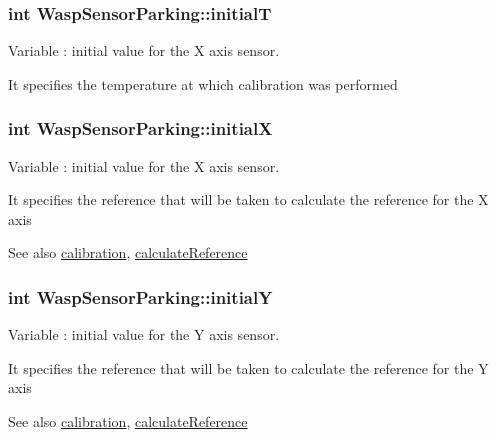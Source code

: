 \subsubsection[{\texorpdfstring{initialT}{initialT}}]{\setlength{\rightskip}{0pt plus 5cm}int Wasp\+Sensor\+Parking\+::initialT}\hypertarget{class_wasp_sensor_parking_adb9a140ea401fbd67abc125f9e1d876f}{}\label{class_wasp_sensor_parking_adb9a140ea401fbd67abc125f9e1d876f}


Variable \+: initial value for the X axis sensor. 

It specifies the temperature at which calibration was performed 
\subsubsection[{\texorpdfstring{initialX}{initialX}}]{\setlength{\rightskip}{0pt plus 5cm}int Wasp\+Sensor\+Parking\+::initialX}\hypertarget{class_wasp_sensor_parking_a0010d75cfb492aef0794721fa9b762ef}{}\label{class_wasp_sensor_parking_a0010d75cfb492aef0794721fa9b762ef}


Variable \+: initial value for the X axis sensor. 

It specifies the reference that will be taken to calculate the reference for the X axis \begin{DoxySeeAlso}{See also}
\hyperlink{class_wasp_sensor_parking_a8e99b4ddd7a0f18b2b96a9c4de18f914}{calibration}, \hyperlink{class_wasp_sensor_parking_a8fe1255a714fed88684a89363963eb02}{calculate\+Reference} 
\end{DoxySeeAlso}
\subsubsection[{\texorpdfstring{initialY}{initialY}}]{\setlength{\rightskip}{0pt plus 5cm}int Wasp\+Sensor\+Parking\+::initialY}\hypertarget{class_wasp_sensor_parking_a1123948e8e4dcff6c6ad7c6d888140c8}{}\label{class_wasp_sensor_parking_a1123948e8e4dcff6c6ad7c6d888140c8}


Variable \+: initial value for the Y axis sensor. 

It specifies the reference that will be taken to calculate the reference for the Y axis \begin{DoxySeeAlso}{See also}
\hyperlink{class_wasp_sensor_parking_a8e99b4ddd7a0f18b2b96a9c4de18f914}{calibration}, \hyperlink{class_wasp_sensor_parking_a8fe1255a714fed88684a89363963eb02}{calculate\+Reference} 
\end{DoxySeeAlso}
